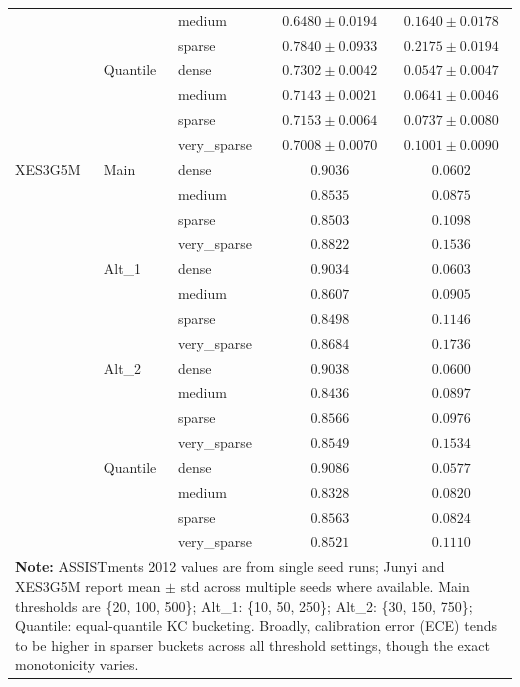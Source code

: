 \begin{table}[H]
{\begin{tabular}{lllcc}
 &  & medium & $0.6480 \pm 0.0194$ & $0.1640 \pm 0.0178$ \\
 &  & sparse & $0.7840 \pm 0.0933$ & $0.2175 \pm 0.0194$ \\
 & Quantile & dense & $0.7302 \pm 0.0042$ & $0.0547 \pm 0.0047$ \\
 &  & medium & $0.7143 \pm 0.0021$ & $0.0641 \pm 0.0046$ \\
 &  & sparse & $0.7153 \pm 0.0064$ & $0.0737 \pm 0.0080$ \\
 &  & very\_sparse & $0.7008 \pm 0.0070$ & $0.1001 \pm 0.0090$ \\
\midrule
XES3G5M & Main & dense & $0.9036$ & $0.0602$ \\
 &  & medium & $0.8535$ & $0.0875$ \\
 &  & sparse & $0.8503$ & $0.1098$ \\
 &  & very\_sparse & $0.8822$ & $0.1536$ \\
 & Alt\_1 & dense & $0.9034$ & $0.0603$ \\
 &  & medium & $0.8607$ & $0.0905$ \\
 &  & sparse & $0.8498$ & $0.1146$ \\
 &  & very\_sparse & $0.8684$ & $0.1736$ \\
 & Alt\_2 & dense & $0.9038$ & $0.0600$ \\
 &  & medium & $0.8436$ & $0.0897$ \\
 &  & sparse & $0.8566$ & $0.0976$ \\
 &  & very\_sparse & $0.8549$ & $0.1534$ \\
 & Quantile & dense & $0.9086$ & $0.0577$ \\
 &  & medium & $0.8328$ & $0.0820$ \\
 &  & sparse & $0.8563$ & $0.0824$ \\
 &  & very\_sparse & $0.8521$ & $0.1110$ \\
\bottomrule
\multicolumn{5}{p{14cm}}{\scriptsize \textbf{Note:} ASSISTments 2012 values are from single seed runs; Junyi and XES3G5M report mean $\pm$ std across multiple seeds where available. Main thresholds are \{20, 100, 500\}; Alt\_1: \{10, 50, 250\}; Alt\_2: \{30, 150, 750\}; Quantile: equal-quantile KC bucketing. Broadly, calibration error (ECE) tends to be higher in sparser buckets across all threshold settings, though the exact monotonicity varies.} \\
\end{tabular}%
}
\end{table}
